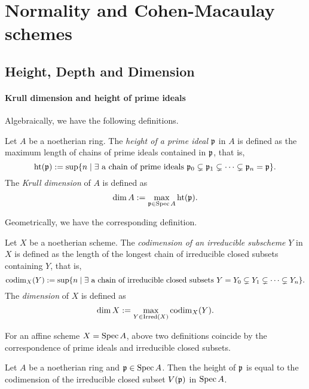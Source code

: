 \section{Normality and Cohen-Macaulay schemes}

\subsection{Height, Depth and Dimension}

    \paragraph{Krull dimension and height of prime ideals}

    Algebraically, we have the following definitions.
    \begin{definition}
        Let $A$ be a noetherian ring.
        The \textit{height of a prime ideal} ${\mathfrak{p}}$ in $A$ is defined as the maximum length of chains of prime ideals contained in ${\mathfrak{p}}$, that is, 
        \[ \operatorname{ht}({\mathfrak{p}}) := \sup\{ n \mid \exists \text{ a chain of prime ideals } {\mathfrak{p}}_0 \subsetneq {\mathfrak{p}}_1 \subsetneq \cdots \subsetneq {\mathfrak{p}}_n = {\mathfrak{p}}\}. \] 
        The \textit{Krull dimension} of $A$ is defined as 
        \[ \dim A := \max_{{\mathfrak{p}} \in \operatorname{Spec} A}\operatorname{ht}({\mathfrak{p}}). \]
    \end{definition}

    Geometrically, we have the corresponding definition.
    \begin{definition}
        Let $X$ be a noetherian scheme.
        The \textit{codimension of an irreducible subscheme} $Y$ in $X$ is defined as the length of the longest chain of irreducible closed subsets containing $Y$, that is, 
        \[ \operatorname{codim}_X(Y) := \sup\{ n \mid \exists \text{ a chain of irreducible closed subsets } Y = Y_0 \subsetneq Y_1 \subsetneq \cdots \subsetneq Y_n\}. \] 
        The \textit{dimension} of $X$ is defined as
        \[ \dim X := \max_{Y \in \text{Irred}(X)}\operatorname{codim}_X(Y). \]
    \end{definition}

    For an affine scheme $X = \operatorname{Spec} A$, above two definitions coincide by the correspondence of prime ideals and irreducible closed subsets.

    \begin{proposition}
        Let $A$ be a noetherian ring and ${\mathfrak{p}} \in \operatorname{Spec} A$.
        Then the height of ${\mathfrak{p}}$ is equal to the codimension of the irreducible closed subset $V({\mathfrak{p}})$ in $\operatorname{Spec} A$.
    \end{proposition}

